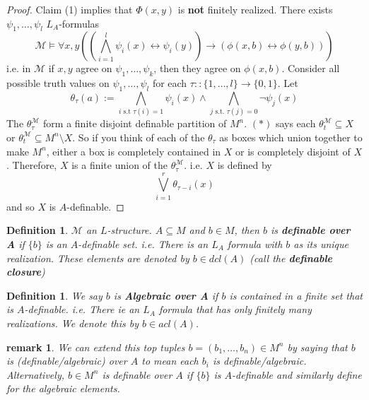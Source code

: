 \documentclass[letterpaper, 12pt]{article}
\newcommand{\fin}{\qquad \quad \hfill \framebox[1.75mm][l]{\,}}
\newcommand{\cM}{\mathcal{M}}
\theoremstyle{stdthm}
\theoremstyle{stddef}
\newtheorem{defn}[thm]{Definition}
\newtheorem{rem}[thm]{remark} %
\theoremstyle{stdnonum}
\theoremstyle{stdqands}
\theoremstyle{stdbold}
\begin{document}
\begin{proof}
Claim (1) implies that $\Phi(x,y)$ is {\bf not} finitely realized. There exists $\psi_1,\dots, \psi_l$ $L_A$-formulas 
\[ \cM \models \forall x,y\left( \left(\bigwedge_{i=1}^l \psi_i(x) \leftrightarrow \psi_i(y) \right) \rightarrow (\phi(x,b) \leftrightarrow \phi(y,b)) \right)\]
i.e. in $\cM$ if $x,y$ agree on $\psi_1,\dots, \psi_k$, then they agree on $\phi(x,b)$. Consider all possible truth values on $\psi_1,\dots, \psi_l$ for each $\tau::\{1,\dots, l\} \to \{0,1\}$. Let 
\[ \tag{*}\theta_\tau(a) := \bigwedge_{i \mbox{ s.t } \tau(i) = 1} \psi_i(x) \wedge \bigwedge_{j \mbox{ s.t. } \tau(j) = 0} \neg \psi_j(x) \]
The $\theta_\tau^\cM$ form a finite disjoint definable partition of $M^n$. $(*)$ says each $\theta_t^\cM \subseteq X$ or $\theta_t^\cM \subseteq M^n \setminus X$. So if you think of each of the $\theta_\tau$ as boxes which union together to make $M^n$, either a box is completely contained in $X$ or is completely disjoint of $X$. Therefore, $X$ is a finite union of the $\theta_\tau^\cM$. i.e. $X$ is defined by 
\[ \bigvee_{i=1}^r \theta_{\tau-i}(x) \]
and so $X$ is $A$-definable. 

\end{proof}

\begin{defn}
$\cM$ an $L$-structure. $A \subseteq M$ and $b \in M$, then $b$ is {\bf definable over A} if $\{b\}$ is an $A$-definable set. i.e. There is an $L_A$ formula with $b$ as its unique realization. These elements are denoted by $b \in dcl(A)$ (call the {\bf definable closure})
\end{defn}

\begin{defn}
We say $b$ is {\bf Algebraic over A} if $b$ is contained in a finite set that is $A$-definable. i.e. There ie an $L_A$ formula that has only finitely many realizations. We denote this by $b \in acl(A)$. 
\end{defn}

\begin{rem}
We can extend this top tuples $b = (b_1,\dots, b_n) \in M^n$ by saying that $b$ is \emph{(definable/algebraic)} over $A$ to mean each $b_i$ is  definable/algebraic. Alternatively, $b \in M^n$ is definable over $A$ if $\{b\}$ is $A$-definable and similarly define for the algebraic elements. 
\end{rem}
\end{document}
